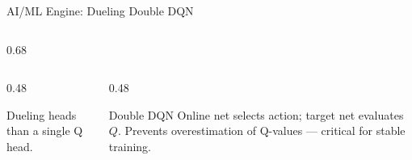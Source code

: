 \documentclass[aspectratio=169,10pt]{beamer}
\begin{document}
\begin{frame}[shrink=10,fragile]{AI/ML Engine: Dueling Double DQN}
\begin{columns}[T]
\begin{column}{0.68\textwidth}
\begin{columns}[T]
\begin{column}{0.48\textwidth}
\begin{keybox}{Dueling heads}
          than a single Q head.
        \end{keybox}
      \end{column}
      \begin{column}{0.48\textwidth}
        \begin{resultbox}{Double DQN}
          \scriptsize Online net selects action; target net evaluates $Q$.
          Prevents overestimation of Q-values — critical for stable training.
        \end{resultbox}
      \end{column}
    \end{columns}
  \end{column}
\end{columns}
\end{frame}

\end{document}
